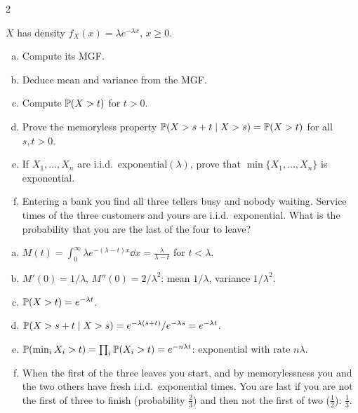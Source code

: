 \begin{paracol}{2}
\begin{exercise}\label{ch03:ex-expo}
$X$ has density $f_X(x)=\lambda e^{-\lambda x}$, $x\ge0$.
\begin{enumerate}[(a)]
  \item Compute its MGF.
  \item Deduce mean and variance from the MGF.
  \item Compute $\mathbb{P}(X>t)$ for $t>0$.
  \item Prove the memoryless property $\mathbb{P}(X>s+t\mid X>s)=\mathbb{P}(X>t)$ for all $s,t>0$.
  \item If $X_1,\dots,X_n$ are i.i.d.\ exponential$(\lambda)$, prove that $\min\{X_1,\dots,X_n\}$ is exponential.
  \item Entering a bank you find all three tellers busy and nobody waiting. Service times of the three customers and
      yours are i.i.d.\ exponential. What is the probability that you are the last of the four to leave?
\end{enumerate}
\end{exercise}
\begin{solution}[ch03:ex-expo]
\begin{enumerate}[(a)]
  \item $M(t)=\int_0^\infty\lambda e^{-(\lambda-t)x}\dd x=\frac{\lambda}{\lambda-t}$ for $t<\lambda$.
  \item $M'(0)=1/\lambda$, $M''(0)=2/\lambda^2$: mean $1/\lambda$, variance $1/\lambda^2$.
  \item $\mathbb{P}(X>t)=e^{-\lambda t}$.
  \item $\mathbb{P}(X>s+t\mid X>s)=e^{-\lambda(s+t)}/e^{-\lambda s}=e^{-\lambda t}$.
  \item $\mathbb{P}(\min_iX_i>t)=\prod_i\mathbb{P}(X_i>t)=e^{-n\lambda t}$: exponential with rate $n\lambda$.
  \item When the first of the three leaves you start, and by memorylessness you and the two others have fresh i.i.d.\ exponential
        times. You are last if you are not the first of three to finish (probability $\frac23$) and then not the first of two
        ($\frac12$): $\frac13$.
\end{enumerate}
\end{solution}


\end{paracol}
